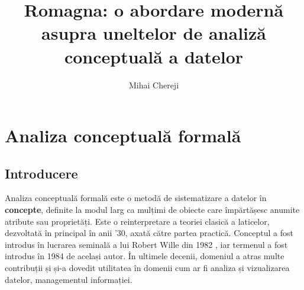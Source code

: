 \documentclass[12pt, a4paper, twoside, romanian]{teza-upb}
\begin{document}
\author{Mihai Chereji}

\title{Romagna: o abordare modernă asupra uneltelor de analiză conceptuală a datelor}




\beforepreface
\listoffigures
\listoftables
{}
\afterpreface 


\chapter{Analiza conceptuală formală}
  \section{Introducere}
    Analiza conceptuală formală este o metodă de sistematizare a datelor în \textbf{concepte}, definite la modul larg ca mulțimi de obiecte care împărtășesc anumite atribute sau proprietăți. Este o reinterpretare a teoriei clasică a laticelor, dezvoltată în principal în anii '30, axată către partea practică. Conceptul a fost introdus în lucrarea seminală a lui Robert Wille din 1982 \cite{wille:1982}, iar termenul a fost introdus în 1984 de același autor. În ultimele decenii, domeniul a atras multe contribuții și și-a dovedit utilitatea în domenii cum ar fi analiza și vizualizarea datelor, managementul informației.
\end{document}

